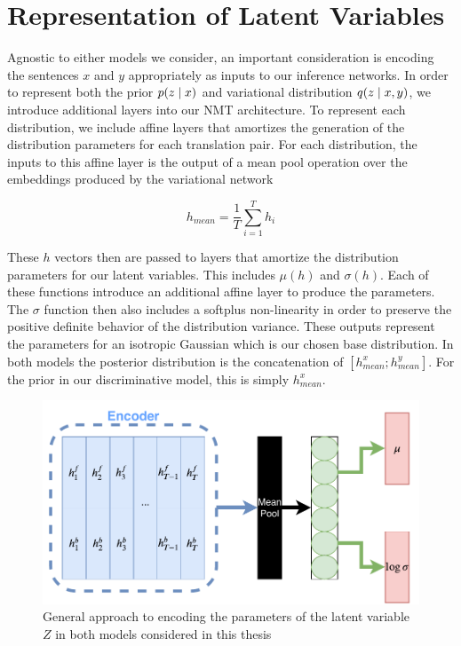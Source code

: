 



\section{Representation of Latent Variables}

Agnostic to either models we consider, an important consideration is encoding the sentences $x$ and $y$ appropriately as inputs to our inference networks. In order to represent both the prior $p(z \; | \;{x})$ and variational distribution $q(z \; | \;{x, y})$, we introduce additional layers into our \ac{NMT} architecture. To represent each distribution, we include affine layers that amortizes the generation of the distribution parameters for each translation pair. For each distribution, the inputs to this affine layer is the output of a mean pool operation over the embeddings produced by the variational network

\begin{equation}
h_{mean} = \frac{1}{T} \sum_{i=1}^{T} h_{i}
\end{equation}

These $h$ vectors then are passed to layers that amortize the distribution parameters for our latent variables. This includes $\mu(h)$ and $\sigma(h)$. Each of these functions introduce an additional affine layer to produce the parameters. The $\sigma$ function then also includes a softplus non-linearity in order to preserve the positive definite behavior of the distribution variance. These outputs represent the parameters for an isotropic Gaussian which is our chosen base distribution. In both models the posterior distribution is the concatenation of $[h_{mean}^{x} ; h_{mean}^{y}]$. For the prior in our discriminative model, this is simply $h_{mean}^{x}$.


\begin{figure}
	\includegraphics[width=\linewidth]{LatentZEncoding.pdf}
	\caption{General approach to encoding the parameters of the latent variable $Z$ in both models considered in this thesis}
	\label{fig:latentZ}
\end{figure}

